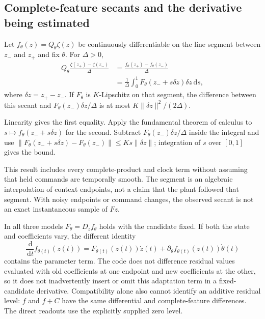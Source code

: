 \documentclass[journal]{IEEEtran}
\newcommand{\dd}{\,\mathrm d}
\begin{document}
\subsection{Complete-feature secants and the derivative being estimated}
\begin{auditproposition}
\label{prop:audit_secant}
Let $f_\theta(z)=Q_\theta\zeta(z)$ be continuously differentiable on the
line segment between $z_-$ and $z_+$ and fix $\theta$. For $\Delta>0$,
\begin{align}
 Q_\theta\frac{\zeta(z_+)-\zeta(z_-)}{\Delta}
 &=\frac{f_\theta(z_+)-f_\theta(z_-)}{\Delta}\\
 &=\frac{1}{\Delta}\int_0^1 F_\theta(z_-+s\delta z)\delta z\dd s,
 \label{eq:audit_secant_identity}
\end{align}
where $\delta z=z_+-z_-$. If $F_\theta$ is $K$-Lipschitz on that segment,
the difference between this secant and
$F_\theta(z_-)\delta z/\Delta$ is at most
$K\|\delta z\|^2/(2\Delta)$.
\end{auditproposition}
\begin{IEEEproof}
Linearity gives the first equality. Apply the fundamental theorem of
calculus to $s\mapsto f_\theta(z_-+s\delta z)$ for the second. Subtract
$F_\theta(z_-)\delta z/\Delta$ inside the integral and use
$\|F_\theta(z_-+s\delta z)-F_\theta(z_-)\|\le Ks\|\delta z\|$;
integration of $s$ over $[0,1]$ gives the bound.
\end{IEEEproof}
This result includes every complete-product and clock term without
assuming that held commands are temporally smooth. The segment is an
algebraic interpolation of context endpoints, not a claim that the plant
followed that segment. With noisy endpoints or command changes, the
observed secant is not an exact instantaneous sample of $F\dot z$.

In all three models $F_\theta=D_zf_\theta$ holds with the candidate fixed.
If both the state and coefficients vary, the different identity
\begin{equation}
 \frac{\dd}{\dd t}f_{\theta(t)}(z(t))
 =F_{\theta(t)}(z(t))\dot z(t)
   +\partial_\theta f_{\theta(t)}(z(t))\dot\theta(t)
 \label{eq:audit_adapting_residual}
\end{equation}
contains the parameter term. The code does not difference residual values
evaluated with old coefficients at one endpoint and new coefficients at
the other, so it does not inadvertently insert or omit this adaptation
term in a fixed-candidate derivative. Compatibility alone also cannot
identify an additive residual level: $f$ and $f+C$ have the same
differential and complete-feature differences. The direct readouts use
the explicitly supplied zero level.
\end{document}
